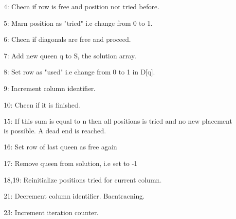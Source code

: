 \documentclass{article}
\begin{document}
\begin{enumerate}
    \item [4:] Checn if row is free and position not tried before.
    \item [5:] Marn position as "tried" i.e change from 0 to 1.
    \item [6:] Checn if diagonals are free and proceed.
    \item [7:] Add new queen q to S, the solution array.
    \item [8:] Set row as "used" i.e change from 0 to 1 in D[q].
    \item [9:] Increment column identifier.
    \item [10:] Checn if it is finished.
    \item [15:] If this sum is equal to n then all positions is tried and 
                no new placement is possible. A dead end is reached.
    \item [16:] Set row of last queen as free again
    \item [17:] Remove queen from solution, i.e set to -1
    \item [18,19:] Reinitialize positions tried for current column. 
    \item [21:] Decrement column identifier. Bacntracning.
    \item [23:] Increment iteration counter.
\end{enumerate}
\end{document}
